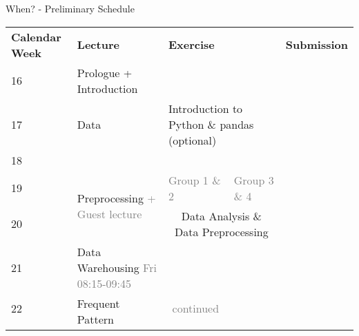\begin{frame}{When? - Preliminary Schedule}
	\footnotesize
	\centering
	\begin{tabular}{|p{4em}|p{15em}|p{9.5em}|p{9.5em}|p{10em}|}
		\hline
		\rowcolor{faugray!62}\textbf{Calendar Week} & \textbf{Lecture}                                                  & \multicolumn{2}{|l|}{\textbf{Exercise}}                                         & \textbf{Submission}                                                      \\ \hhline{*{5}{:=}:}
		\cellcolor{faugray!25}16                    & Prologue + Introduction                                           & \multicolumn{2}{|l|}{\cellcolor{gray!50}}                                       & \cellcolor{gray!50}                                                      \\ \hhline{|-|-|-|-|-|}
		\cellcolor{faugray!25}17                    & Data                                                              & \multicolumn{2}{|l|}{Introduction to Python \& pandas {\color{gray}(optional)}} & \cellcolor{gray!50}                                                      \\ \hhline{|-|-|-|-|-|}
		\cellcolor{faugray!25}18                    & \multicolumn{4}{|l|}{\cellcolor{gray!50}}                                                                                                                                                                                      \\ \hhline{|-|-|-|-|-|}
		\cellcolor{faugray!25}19                    & \multirow{2}{*}{Preprocessing \textcolor{gray}{ + Guest lecture}} & \centering\tiny\textcolor{gray}{Group 1 \& 2}                                   & \centering\tiny\textcolor{gray}{Group 3 \& 4}      & \cellcolor{gray!50} \\ \hhline{|-|~|~~|-|}
		\cellcolor{faugray!25}20                    &                                                                   & \multicolumn{2}{|c|}{Data Analysis \& Data Preprocessing}                       & \cellcolor{gray!50}                                                      \\ \hhline{|--|~|~|-|}
		\cellcolor{faugray!25}21                    & Data Warehousing \textcolor{gray}{\tiny Fri 08:15-09:45}          & \cellcolor{gray!50}                                                             &                                                    & \cellcolor{gray!50} \\ \hhline{|-|-|-|-|-|}
		\cellcolor{faugray!25}22                    & \multirow{2}{*}{Frequent Pattern}                                 & \multicolumn{1}{|c|}{\textcolor{gray}{\tiny continued}}                         & \cellcolor{gray!50}                                & \cellcolor{gray!50} \\ \hhline{|-|~|-|-|-|}

\end{tabular}
\end{frame}
